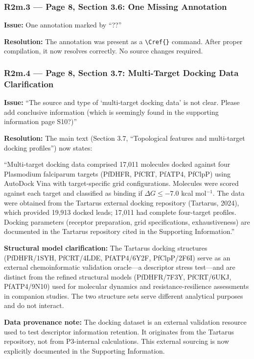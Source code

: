 \documentclass[11pt]{article}
\begin{document}
\subsubsection*{R2m.3 --- Page 8, Section 3.6: One Missing Annotation}
\textbf{Issue:} One annotation marked by ``??''

\textbf{Resolution:}
The annotation was present as a \texttt{\textbackslash Cref\{\}} command. After proper compilation, 
it now resolves correctly. No source changes required.

\subsubsection*{R2m.4 --- Page 8, Section 3.7: Multi-Target Docking Data Clarification}
\textbf{Issue:} ``The source and type of `multi-target docking data' is not clear. 
Please add conclusive information (which is seemingly found in the supporting information 
page S10?)''

\textbf{Resolution:}
The main text (Section 3.7, ``Topological features and multi-target docking profiles'') now states:

``Multi-target docking data comprised 17,011 molecules docked against four Plasmodium 
falciparum targets (PfDHFR, PfCRT, PfATP4, PfClpP) using AutoDock Vina with target-specific 
grid configurations. Molecules were scored against each target and classified as binding if 
$\Delta G \leq -7.0$ kcal mol$^{-1}$. The data were obtained from the Tartarus external docking 
repository (Tartarus, 2024), which provided 19,913 docked leads; 17,011 had complete four-target 
profiles. Docking parameters (receptor preparation, grid specifications, exhaustiveness) are 
documented in the Tartarus repository cited in the Supporting Information.''

\textbf{Structural model clarification:} The Tartarus docking structures (PfDHFR/1SYH, 
PfCRT/4LDE, PfATP4/6Y2F, PfClpP/2F6I) serve as an external chemoinformatic validation 
oracle—a descriptor stress test—and are distinct from the refined structural models 
(PfDHFR/7F3Y, PfCRT/6UKJ, PfATP4/9N10) used for molecular dynamics and resistance-resilience 
assessments in companion studies. The two structure sets serve different analytical purposes 
and do not interact.

\textbf{Data provenance note:} The docking dataset is an external validation resource used 
to test descriptor information retention. It originates from the Tartarus repository, not 
from P3-internal calculations. This external sourcing is now explicitly documented in the 
Supporting Information.
\end{document}
